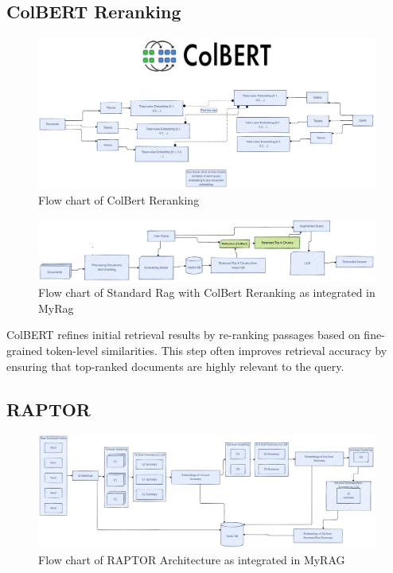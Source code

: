 \documentclass{scrartcl}
\begin{document}
\subsection{ColBERT Reranking}


\begin{figure}[H]
	\centering
	\includegraphics[width=\linewidth]{Colbert.pdf}
	\caption{Flow chart of ColBert Reranking}
	\label{fig:colbert}
\end{figure}


\begin{figure}[H]
	\centering
	\includegraphics[width=\linewidth]{StandardRagWithReRanking.pdf}
	\caption{Flow chart of Standard Rag with ColBert Reranking as integrated in MyRag}
	\label{fig:reranking_rag}
\end{figure}

ColBERT \cite{khattab2020colbert} refines initial retrieval results by re-ranking passages based on fine-grained token-level similarities. This step often improves retrieval accuracy by ensuring that top-ranked documents are highly relevant to the query.

\subsection{RAPTOR}


\begin{figure}[H]
	\centering
	\includegraphics[width=\linewidth]{Raptor.pdf}
	\caption{Flow chart of RAPTOR Architecture as integrated in MyRAG}
	\label{fig:raptor}
\end{figure}
\end{document}
